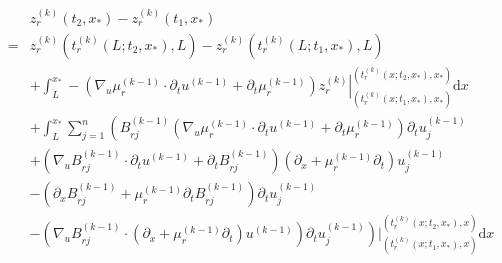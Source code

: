 \documentclass[notitlepage,cs4size,punct,oneside]{ctexrep}
\numberwithin{equation}{chapter}
\theoremstyle{mystyle}
\begin{document}
\begin{align}
      & z_{r}^{(k)}\left(t_{2}, x_{*}\right)-z_{r}^{(k)}\left(t_{1}, x_{*}\right)\nonumber                                                                                                                                                                                                                                                  \\
    = & z_{r}^{(k)}\left(t_{r}^{(k)}\left(L ; t_{2}, x_{*}\right), L\right)-z_{r}^{(k)}\left(t_{r}^{(k)}\left(L ; t_{1}, x_{*}\right), L\right)\nonumber                                                                                                                                                                                    \\
      & +\int_{L}^{x_{*}}-\left.\left(\nabla_{u} \mu_{r}^{(k-1)} \cdot \partial_{t} u^{(k-1)} + \partial_{t}\mu_{r}^{(k-1)} \right) z_{r}^{(k)}\right|_{\left(t_{r}^{(k)}\left(x ; t_{1}, x_{*}\right), x_{*}\right)} ^{\left(t_{r}^{(k)}\left(x ; t_{2}, x_{*}\right), x_{*}\right)} \mathrm{d} x\nonumber                                 \\
      & +\int_{L}^{x_{*}} \sum_{j=1}^{n}\left(B_{r j}^{(k-1)}\left(\nabla_{u} \mu_{r}^{(k-1)} \cdot \partial_{t} u^{(k-1)} + \partial_{t}\mu_{r}^{(k-1)} \right) \partial_{t} u_{j}^{(k-1)}\right.\nonumber                                                                                                                                 \\
      & +\left(\nabla_{u} B_{r j}^{(k-1)} \cdot \partial_{t} u^{(k-1)} + \partial_{t}B_{r j}^{(k-1)}\right)\left(\partial_{x}+\mu_{r}^{(k-1)} \partial_{t}\right) u_{j}^{(k-1)}\nonumber                                                                                                                                                    \\
      & -\left(\partial_{x}B_{r j}^{(k-1)} +\mu_{r}^{(k-1)} \partial_{t}B_{r j}^{(k-1)}  \right) \partial_{t} u_{j}^{(k-1)}\nonumber                                                                                                                                                                                                        \\
      & \left.-\left(\nabla_{u} B_{r j}^{(k-1)} \cdot\left(\partial_{x}+\mu_{r}^{(k-1)} \partial_{t}\right) u^{(k-1)}\right) \partial_{t} u_{j}^{(k-1)}\right)\left.\right|_{\left(t_{r}^{(k)}\left(x ; t_{1}, x_{*}\right), x\right)} ^{\left(t_{r}^{(k)}\left(x ; t_{2}, x_{*}\right), x\right)} \mathrm{d} x\nonumber                    \\

\end{align}
\end{document}
